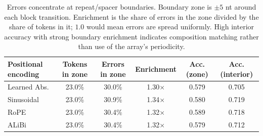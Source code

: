 \begin{table}[t]
\centering
\caption{Errors concentrate at repeat/spacer boundaries. Boundary zone is $\pm5$ nt around each block transition. Enrichment is the share of errors in the zone divided by the share of tokens in it; $1.0$ would mean errors are spread uniformly. High interior accuracy with strong boundary enrichment indicates composition matching rather than use of the array's periodicity.}
\label{tab:error-concentration}
\begin{tabular}{lccccc}
\toprule
Positional encoding & Tokens in zone & Errors in zone & Enrichment & Acc. (zone) & Acc. (interior) \\
\midrule
Learned Abs. & 23.0\% & 30.0\% & 1.30$\times$ & 0.579 & 0.705 \\
Sinusoidal & 23.0\% & 30.9\% & 1.34$\times$ & 0.580 & 0.719 \\
RoPE & 23.0\% & 30.4\% & 1.32$\times$ & 0.589 & 0.718 \\
ALiBi & 23.0\% & 30.4\% & 1.32$\times$ & 0.579 & 0.712 \\
\bottomrule
\end{tabular}
\end{table}